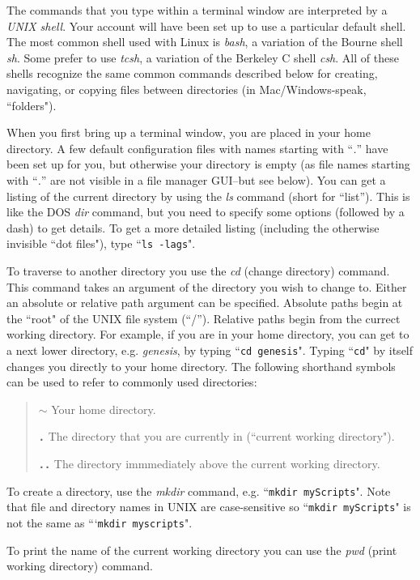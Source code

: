 \documentclass[12pt]{article}
\begin{document}
The commands that you type within a terminal window are interpreted by a {\it UNIX shell}. Your account will have been set up to use a particular default shell. The most common shell used with Linux is {\it bash}, a variation of the Bourne shell {\it sh}. Some prefer to use {\it tcsh}, a variation of the Berkeley C shell {\it csh}. All of these shells recognize the same common commands described below for creating, navigating, or copying files between directories (in Mac/Windows-speak, ``folders").

When you first bring up a terminal window, you are placed in your home directory. A few default configuration files with names starting with ``{\it .}'' have been set up for you, but otherwise your directory is empty (as file names starting with ``{\it .}'' are not visible in a file manager GUI--but see below). You can get a listing of the current directory by using the {\it ls} command (short for ``list''). This is like the DOS {\it dir} command, but you need to specify some options (followed by a dash) to get details. To get a more detailed listing (including the otherwise invisible ``dot files"), type ``{\tt ls -lags}".

To traverse to another directory you use the {\it cd} (change directory) command. This command takes an argument of the directory you wish to change to. Either an absolute or relative path argument can be specified. Absolute paths begin at the ``root" of the UNIX file system (``/''). Relative paths begin from the currect working directory. For example, if you are in your home directory, you can get to a next lower directory, e.g. {\it genesis}, by typing ``{\tt cd genesis}". Typing ``{\tt cd}" by itself changes you directly to your home directory. The following shorthand symbols can be used to refer to commonly used directories:

\begin{quote}
	$\sim$ Your home directory.
	
	{\tt\bf .} The directory that you are currently in (``current working directory").
	
	 {\tt\bf ..} The directory immmediately above the current working directory. 
\end{quote}

To create a directory, use the {\it mkdir} command, e.g. ``{\tt mkdir myScripts}". Note that file and directory names in UNIX are case-sensitive so ``{\tt mkdir myScripts}" is not the same as ```{\tt mkdir myscripts}".

To print the name of the current working directory you can use the {\it pwd} (print working directory) command.
\end{document}

